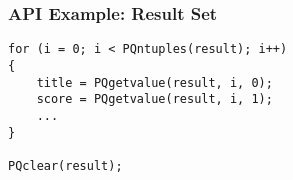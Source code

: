 \documentclass[dvipsnames]{beamer}
\theoremstyle{plain}
\begin{document}
\begin{frame}[fragile]
  \frametitle{API Example: Result Set}

  \begin{lstlisting}
for (i = 0; i < PQntuples(result); i++)
{
    title = PQgetvalue(result, i, 0);
    score = PQgetvalue(result, i, 1);
    ...
}

PQclear(result);
  \end{lstlisting}
\end{frame}
%
%
%
%
%
%
%
%
%
%
%
\end{document}
